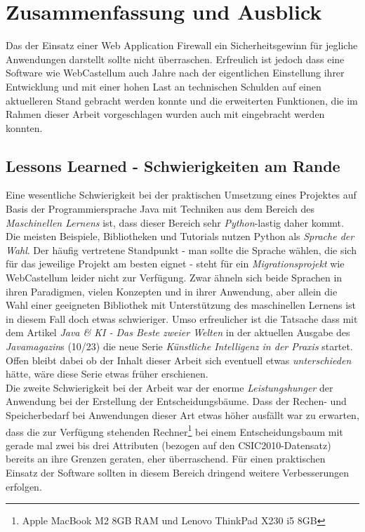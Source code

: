 \chapter{Zusammenfassung und Ausblick}



Das der Einsatz einer Web Application Firewall ein Sicherheitsgewinn für jegliche Anwendungen darstellt sollte nicht überraschen. Erfreulich ist jedoch dass eine Software wie WebCastellum auch Jahre nach der eigentlichen Einstellung ihrer Entwicklung und mit einer hohen Last an technischen Schulden auf einen aktuelleren Stand gebracht werden konnte und die erweiterten Funktionen, die im Rahmen dieser Arbeit vorgeschlagen wurden auch mit eingebracht werden konnten.

\section{Lessons Learned - Schwierigkeiten am Rande}
Eine wesentliche Schwierigkeit bei der praktischen Umsetzung eines Projektes auf Basis der Programmiersprache Java mit Techniken aus dem Bereich des \emph{Maschinellen Lernens} ist, dass dieser Bereich sehr \glqq\emph{Python}\grqq-lastig daher kommt. Die meisten Beispiele, Bibliotheken und Tutorials nutzen Python als \emph{Sprache der Wahl}. Der häufig vertretene Standpunkt - man sollte die Sprache wählen, die sich für das jeweilige Projekt am besten eignet - steht für ein \emph{Migrationsprojekt} wie WebCastellum leider nicht zur Verfügung. Zwar ähneln sich beide Sprachen in ihren Paradigmen, vielen Konzepten und in ihrer Anwendung, aber allein die Wahl einer geeigneten Bibliothek mit Unterstützung des maschinellen Lernens ist in diesem Fall doch etwas schwieriger. Umso erfreulicher ist die Tatsache dass mit dem Artikel \glqq\emph{Java \& KI - Das Beste zweier Welten}\grqq{} in der aktuellen Ausgabe des \emph{Javamagazin}s (10/23) die neue Serie \glqq\emph{Künstliche Intelligenz in der Praxis}\grqq{} startet. Offen bleibt dabei ob der Inhalt dieser Arbeit sich eventuell etwas \emph{unterschieden} hätte, wäre diese Serie etwas früher erschienen.\\

Die zweite Schwierigkeit bei der Arbeit war der enorme \emph{Leistungshunger} der Anwendung bei der Erstellung der Entscheidungsbäume. Dass der Rechen- und Speicherbedarf bei Anwendungen dieser Art etwas höher ausfällt war zu erwarten, dass die zur Verfügung stehenden Rechner\footnote{Apple MacBook M2 8GB RAM und Lenovo ThinkPad X230 i5 8GB} bei einem Entscheidungsbaum mit gerade mal zwei bis drei Attributen (bezogen auf den CSIC2010-Datensatz) bereits an ihre Grenzen geraten, eher überraschend. Für einen praktischen Einsatz der Software sollten in diesem Bereich dringend weitere Verbesserungen erfolgen.\\




